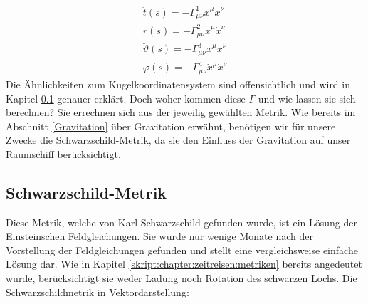 \begin{refsection}
	\begin{align*}
	\ddot{t}(s) = -\Gamma^{1}_{\mu\nu}\dot{x}^{\mu}\dot{x}^{\nu}\\
	\ddot{r}(s) = -\Gamma^{2}_{\mu\nu}\dot{x}^{\mu}\dot{x}^{\nu}\\
	\ddot{\vartheta}(s) = -\Gamma^{3}_{\mu\nu}\dot{x}^{\mu}\dot{x}^{\nu}\\
	\ddot{\varphi}(s) = -\Gamma^{4}_{\mu\nu}\dot{x}^{\mu}\dot{x}^{\nu}		
	\end{align*}\label{skript:chapter:zeitreisen:geodaeten4dim}
	Die Ähnlichkeiten zum Kugelkoordinatensystem sind offensichtlich und wird in Kapitel \ref{Schwarzschild-Metrik} genauer erklärt.
	Doch woher kommen diese $\Gamma$ und wie lassen sie sich berechnen?
	Sie errechnen sich aus der jeweilig gewählten Metrik. 
	Wie bereits im Abschnitt \ref{Gravitation} über Gravitation erwähnt, benötigen wir für unsere Zwecke die Schwarzschild-Metrik, da sie den Einfluss der Gravitation auf unser Raumschiff berücksichtigt. 

	\subsection{Schwarzschild-Metrik}\label{Schwarzschild-Metrik}
	
	Diese Metrik, welche von Karl Schwarzschild gefunden wurde, ist ein Lösung der Einsteinschen Feldgleichungen. Sie wurde nur wenige Monate nach der Vorstellung der Feldgleichungen gefunden und stellt eine vergleichsweise einfache Lösung dar. Wie in Kapitel \ref{skript:chapter:zeitreisen:metriken} bereits angedeutet wurde, berücksichtigt sie weder Ladung noch Rotation des schwarzen Lochs. 
	Die Schwarzschildmetrik in Vektordarstellung:
	

\end{refsection}
